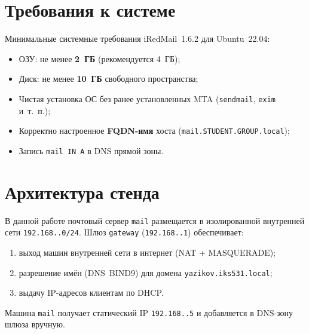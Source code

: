 \section{Требования к системе}

Минимальные системные требования iRedMail~1.6.2 для Ubuntu~22.04:
\begin{itemize}
  \item ОЗУ: не менее \textbf{2~ГБ} (рекомендуется 4~ГБ);
  \item Диск: не менее \textbf{10~ГБ} свободного пространства;
  \item Чистая установка ОС без ранее установленных MTA
        (\texttt{sendmail}, \texttt{exim} и~т.~п.);
  \item Корректно настроенное \textbf{FQDN-имя} хоста (\texttt{mail.STUDENT.GROUP.local});
  \item Запись \texttt{mail~IN~A} в DNS прямой зоны.
\end{itemize}

\section{Архитектура стенда}

В данной работе почтовый сервер \texttt{mail} размещается в изолированной
внутренней сети \texttt{192.168.\cfgLabStudentN.0/24}.
Шлюз \texttt{gateway} (\texttt{192.168.\cfgLabStudentN.1}) обеспечивает:
\begin{enumerate}
  \item выход машин внутренней сети в интернет (NAT + MASQUERADE);
  \item разрешение имён (DNS~BIND9) для домена
        \texttt{yazikov.iks531.local};
  \item выдачу IP-адресов клиентам по DHCP.
\end{enumerate}

Машина \texttt{mail} получает статический IP \texttt{192.168.\cfgLabStudentN.5}
и добавляется в DNS-зону шлюза вручную.

\endinput
